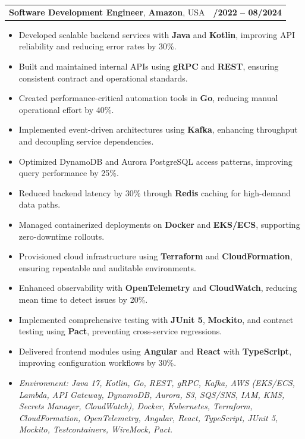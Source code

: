 \documentclass[letterpaper,11pt]{article}
\makeatletter
\newcommand{\resumeItem}[1]{
  \item\footnotesize{
    {#1 \vspace{-2pt}}
  }
}
\newcommand{\resumeSubheading}[4]{
  \vspace{-2pt}\item
    \begin{tabular*}{1.0\textwidth}[t]{l@{\extracolsep{\fill}}r}
      \textbf{\fontsize{10pt}{14pt}\selectfont #3}, \textbf{\fontsize{10pt}{14pt}\selectfont #1}, \fontsize{10pt}{14pt}\selectfont #4 & \textbf{\fontsize{10pt}{14pt}\selectfont #2} \\
    \end{tabular*}\vspace{-7pt}
}
\newcommand{\resumeItemListStart}{\begin{itemize}[leftmargin=*]}
\newcommand{\resumeItemListEnd}{\end{itemize}\vspace{-5pt}}
\makeatother
\begin{document}
\resumeSubheading
{Amazon}{10/2022 -- 08/2024}
{Software Development Engineer}{USA}
\resumeItemListStart
  \resumeItem{Developed scalable backend services with \textbf{Java} and \textbf{Kotlin}, improving API reliability and reducing error rates by 30\%.}
  \resumeItem{Built and maintained internal APIs using \textbf{gRPC} and \textbf{REST}, ensuring consistent contract and operational standards.}
  \resumeItem{Created performance-critical automation tools in \textbf{Go}, reducing manual operational effort by 40\%.}
  \resumeItem{Implemented event-driven architectures using \textbf{Kafka}, enhancing throughput and decoupling service dependencies.}
  \resumeItem{Optimized DynamoDB and Aurora PostgreSQL access patterns, improving query performance by 25\%.}
  \resumeItem{Reduced backend latency by 30\% through \textbf{Redis} caching for high-demand data paths.}
  \resumeItem{Managed containerized deployments on \textbf{Docker} and \textbf{EKS/ECS}, supporting zero-downtime rollouts.}
  \resumeItem{Provisioned cloud infrastructure using \textbf{Terraform} and \textbf{CloudFormation}, ensuring repeatable and auditable environments.}
  \resumeItem{Enhanced observability with \textbf{OpenTelemetry} and \textbf{CloudWatch}, reducing mean time to detect issues by 20\%.}
  \resumeItem{Implemented comprehensive testing with \textbf{JUnit 5}, \textbf{Mockito}, and contract testing using \textbf{Pact}, preventing cross-service regressions.}
  \resumeItem{Delivered frontend modules using \textbf{Angular} and \textbf{React} with \textbf{TypeScript}, improving configuration workflows by 30\%.}
  \resumeItem{\textit{Environment: Java 17, Kotlin, Go, REST, gRPC, Kafka, AWS (EKS/ECS, Lambda, API Gateway, DynamoDB, Aurora, S3, SQS/SNS, IAM, KMS, Secrets Manager, CloudWatch), Docker, Kubernetes, Terraform, CloudFormation, OpenTelemetry, Angular, React, TypeScript, JUnit 5, Mockito, Testcontainers, WireMock, Pact.}}
\resumeItemListEnd
\end{document}
